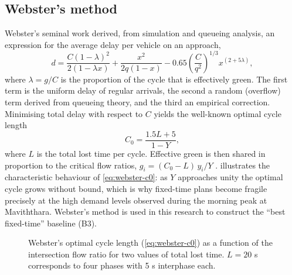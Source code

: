 \subsection{Webster's method}
Webster's seminal work \cite{webster1958} derived, from simulation and queueing analysis, an expression for the
average delay per vehicle on an approach,
\begin{equation}
  d = \frac{C(1-\lambda)^2}{2(1-\lambda x)} + \frac{x^2}{2q(1-x)} - 0.65\left(\frac{C}{q^2}\right)^{1/3} x^{(2+5\lambda)},
  \label{eq:webster-delay}
\end{equation}
where $\lambda = g/C$ is the proportion of the cycle that is effectively green. The first term is the uniform
delay of regular arrivals, the second a random (overflow) term derived from queueing theory, and the third an
empirical correction. Minimising total delay with respect to $C$ yields the well-known optimal cycle length
\begin{equation}
  C_0 = \frac{1.5L + 5}{1 - Y},
  \label{eq:webster-c0}
\end{equation}
where $L$ is the total lost time per cycle. Effective green is then shared in proportion to the critical flow
ratios, $g_i = (C_0 - L)\,y_i/Y$ \cite{webster1958,koonce2008timing}.  illustrates the
characteristic behaviour of \cref{eq:webster-c0}: as $Y$ approaches unity the optimal cycle grows without bound,
which is why fixed-time plans become fragile precisely at the high demand levels observed during the morning peak
at Maviththara. Webster's method is used in this research to construct the ``best fixed-time'' baseline (B3).

\begin{figure}[H]
  \centering
  \caption{Webster's optimal cycle length (\cref{eq:webster-c0}) as a function of the intersection flow ratio
  for two values of total lost time. $L=20$ s corresponds to four phases with 5 s interphase each.}
  \label{fig:webster-c0}
\end{figure}

